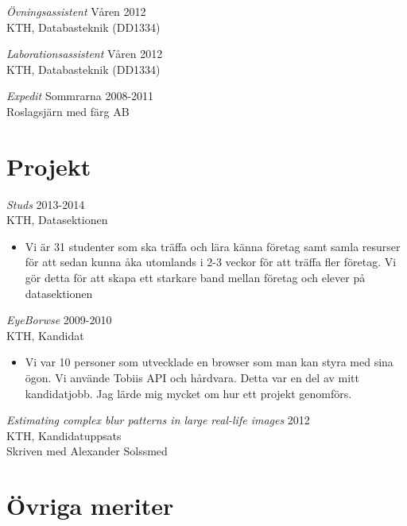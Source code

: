 \documentclass[margin, 10pt]{res} %
\begin{document}
\begin{resume}
{\sl Övningsassistent} \hfill Våren 2012 \\
KTH, Databasteknik (DD1334)

{\sl Laborationsassistent} \hfill Våren 2012 \\
KTH, Databasteknik (DD1334)

{\sl Expedit} \hfill Sommrarna 2008-2011 \\
Roslagsjärn med färg AB


\section{Projekt}

{\sl Studs} \hfill 2013-2014 \\
KTH, Datasektionen
\begin{itemize} 
\item Vi är 31 studenter som ska träffa och lära känna företag samt samla resurser för att sedan kunna åka utomlands i 2-3 veckor för att träffa fler företag. Vi gör detta för att skapa ett starkare band mellan företag och elever på datasektionen
\end{itemize} 

{\sl EyeBorwse} \hfill 2009-2010 \\
KTH, Kandidat
\begin{itemize} 
\item Vi var 10 personer som utvecklade en browser som man kan styra med sina ögon. Vi använde Tobiis API och hårdvara. Detta var en del av mitt kandidatjobb. Jag lärde mig mycket om hur ett projekt genomförs.
\end{itemize} 

{\sl Estimating complex blur patterns in large real-life images} \hfill 2012 \\
KTH, Kandidatuppsats \\
Skriven med Alexander Solssmed



\section{Övriga meriter}


\end{resume}
\end{document}
